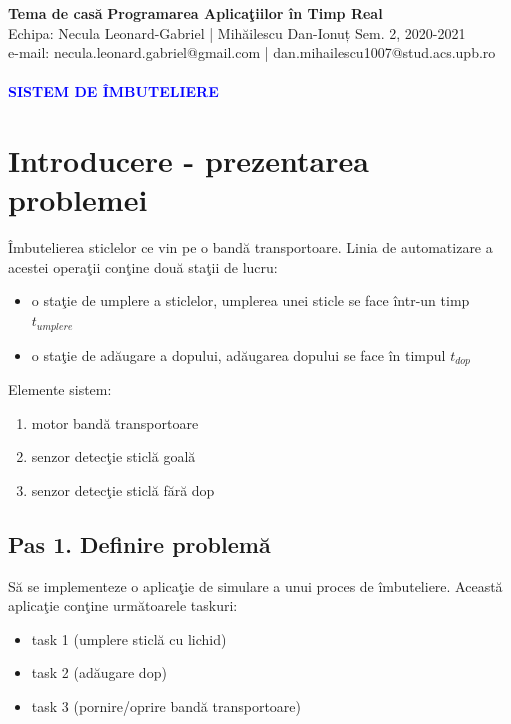 \documentclass[a4paper, 11pt]{article}
\begin{document}

\noindent
\large\textbf{Tema de cas\u{a}} \hfill \textbf{Programarea Aplica\c{t}iilor \^{i}n Timp Real} \\
\normalsize Echipa: Necula Leonard-Gabriel | Mihăilescu Dan-Ionuț  \hfill Sem. 2, 2020-2021 \\ 
\normalsize e-mail: necula.leonard.gabriel@gmail.com | dan.mihailescu1007@stud.acs.upb.ro \\
\\
\large\textbf{\textcolor{blue}{SISTEM DE \^{I}MBUTELIERE}}



\section{Introducere - prezentarea problemei}

\hspace{2pc} \^{I}mbutelierea sticlelor ce vin pe o band\u{a} transportoare. Linia de automatizare a acestei opera\c{t}ii con\c{t}ine dou\u{a} sta\c{t}ii de lucru:
\begin{itemize}
    \item o sta\c{t}ie de umplere a sticlelor, umplerea unei sticle se face \^{i}ntr-un timp $t_{umplere}$ 
    \item o sta\c{t}ie de ad\u{a}ugare a dopului, ad\u{a}ugarea dopului se face \^{i}n timpul $t_{dop}$ 
\end{itemize}
Elemente sistem:
\begin{enumerate}
    \item motor band\u{a} transportoare
    \item senzor detec\c{t}ie sticl\u{a} goal\u{a}
    \item senzor detec\c{t}ie sticl\u{a} f\u{a}r\u{a} dop
\end{enumerate}




\subsection{Pas 1. Definire problem\u{a}}

\hspace{2pc}S\u{a} se implementeze o aplica\c{t}ie de simulare a unui proces de \^{i}mbuteliere. Aceast\u{a} aplica\c{t}ie con\c{t}ine urm\u{a}toarele taskuri:

\begin{itemize}
\item task 1 (umplere sticl\u{a} cu lichid)
\item task 2 (ad\u{a}ugare dop)
\item task 3 (pornire/oprire band\u{a} transportoare)
\end{itemize}
 
\end{document}
